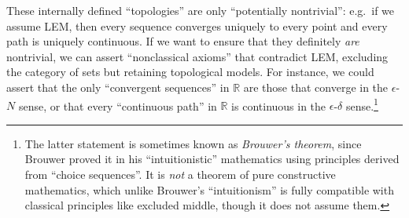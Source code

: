 \documentclass[12pt]{article}
\def\R{\mathbb{R}}
\def\U{\mathscr{U}}
\def\T{\mathcal{T}}
\numberwithin{equation}{section}
\begin{document}
These internally defined ``topologies'' are only ``potentially nontrivial'': e.g.\ if we assume LEM, then every sequence converges uniquely to every point and every path is uniquely continuous.
If we want to ensure that they definitely \emph{are} nontrivial, we can assert ``nonclassical axioms'' that contradict LEM, excluding the category of sets but retaining topological models.
For instance, we could assert that the only ``convergent sequences'' in $\R$ are those that converge in the $\epsilon$-$N$ sense, or that every ``continuous path'' in $\R$ is continuous in the $\epsilon$-$\delta$ sense.\footnote{The latter statement is sometimes known as \emph{Brouwer's theorem}, since Brouwer proved it in his ``intuitionistic'' mathematics using principles derived from ``choice sequences''.  It is \emph{not} a theorem of pure constructive mathematics, which unlike Brouwer's ``intuitionism'' is fully compatible with classical principles like excluded middle, though it does not assume them.}
\end{document}
